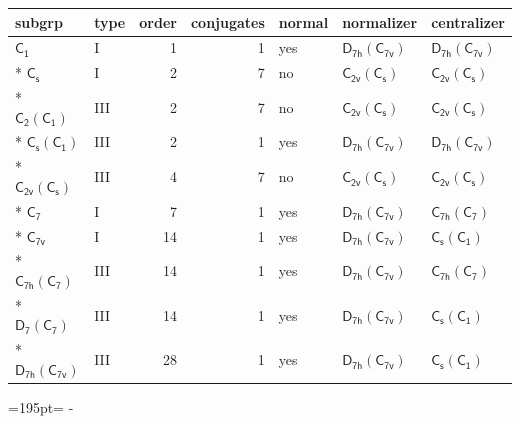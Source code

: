 \documentclass[10pt,a4paper]{article}
\newcommand{\needspace}[1]{\par\penalty-100\begingroup\dimen0=#1\relax\dimen2=\pagegoal
  \advance\dimen2-\pagetotal\ifdim\dimen0>\dimen2\relax\ifdim\dimen2>0pt\vfil\break\fi\fi
  \endgroup}
\numberwithin{equation}{section}
\newcommand{\grp}[1]{\mathsf{#1}}
\begin{document}
{\small\begin{longtable}{@{}llrrlll@{}}\toprule
subgrp & type & order & conjugates & normal & normalizer & centralizer\\\midrule\endhead
\bottomrule\endfoot\endlastfoot
\href{../../../rotation/data/pdf/C1.pdf}{$\grp{C_{1}}$} & I & 1 & 1 & yes & \href{D7h-C7v.pdf}{$\grp{D_{7h}}(\grp{C_{7v}})$} & \href{D7h-C7v.pdf}{$\grp{D_{7h}}(\grp{C_{7v}})$}\\*
\href{../../../rotation/data/pdf/C1v.pdf}{$\grp{C_{s}}$} & I & 2 & 7 & no & \href{C2v-C1v.pdf}{$\grp{C_{2v}}(\grp{C_{s}})$} & \href{C2v-C1v.pdf}{$\grp{C_{2v}}(\grp{C_{s}})$}\\*
\href{C2-C1.pdf}{$\grp{C_{2}}(\grp{C_{1}})$} & III & 2 & 7 & no & \href{C2v-C1v.pdf}{$\grp{C_{2v}}(\grp{C_{s}})$} & \href{C2v-C1v.pdf}{$\grp{C_{2v}}(\grp{C_{s}})$}\\*
\href{C1v-C1.pdf}{$\grp{C_{s}}(\grp{C_{1}})$} & III & 2 & 1 & yes & \href{D7h-C7v.pdf}{$\grp{D_{7h}}(\grp{C_{7v}})$} & \href{D7h-C7v.pdf}{$\grp{D_{7h}}(\grp{C_{7v}})$}\\*
\href{C2v-C1v.pdf}{$\grp{C_{2v}}(\grp{C_{s}})$} & III & 4 & 7 & no & \href{C2v-C1v.pdf}{$\grp{C_{2v}}(\grp{C_{s}})$} & \href{C2v-C1v.pdf}{$\grp{C_{2v}}(\grp{C_{s}})$}\\*
\href{../../../rotation/data/pdf/C7.pdf}{$\grp{C_{7}}$} & I & 7 & 1 & yes & \href{D7h-C7v.pdf}{$\grp{D_{7h}}(\grp{C_{7v}})$} & \href{C7h-C7.pdf}{$\grp{C_{7h}}(\grp{C_{7}})$}\\*
\href{../../../rotation/data/pdf/C7v.pdf}{$\grp{C_{7v}}$} & I & 14 & 1 & yes & \href{D7h-C7v.pdf}{$\grp{D_{7h}}(\grp{C_{7v}})$} & \href{C1v-C1.pdf}{$\grp{C_{s}}(\grp{C_{1}})$}\\*
\href{C7h-C7.pdf}{$\grp{C_{7h}}(\grp{C_{7}})$} & III & 14 & 1 & yes & \href{D7h-C7v.pdf}{$\grp{D_{7h}}(\grp{C_{7v}})$} & \href{C7h-C7.pdf}{$\grp{C_{7h}}(\grp{C_{7}})$}\\*
\href{D7-C7.pdf}{$\grp{D_{7}}(\grp{C_{7}})$} & III & 14 & 1 & yes & \href{D7h-C7v.pdf}{$\grp{D_{7h}}(\grp{C_{7v}})$} & \href{C1v-C1.pdf}{$\grp{C_{s}}(\grp{C_{1}})$}\\*
\href{D7h-C7v.pdf}{$\grp{D_{7h}}(\grp{C_{7v}})$} & III & 28 & 1 & yes & \href{D7h-C7v.pdf}{$\grp{D_{7h}}(\grp{C_{7v}})$} & \href{C1v-C1.pdf}{$\grp{C_{s}}(\grp{C_{1}})$}\\
\bottomrule\end{longtable}}
\needspace{195pt}
\end{document}
